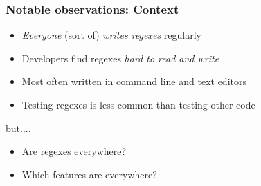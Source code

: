 

\begin{frame}
\frametitle{Notable observations: Context}

\begin{block}{}
\begin{itemize}
	\item {\em Everyone} (sort of) {\em writes regexes} regularly 
	\item Developers find regexes {\em hard to read and write}
	\item Most often written in command line and text editors
	\item Testing regexes is {less} common than testing other code
\end{itemize}
\end{block}

but....

\begin{block}{}
\begin{itemize}
\item Are regexes everywhere?
\item Which features are everywhere?
\end{itemize}
\end{block}



\end{frame}









